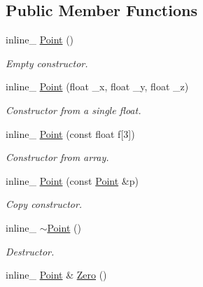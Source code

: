 \subsection*{Public Member Functions}
\begin{DoxyCompactItemize}
\item 
inline\+\_\+ \hyperlink{classOpcode_1_1Point_a0c5df0f77b3306c301db016c1735c23b}{Point} ()\hypertarget{classOpcode_1_1Point_a0c5df0f77b3306c301db016c1735c23b}{}\label{classOpcode_1_1Point_a0c5df0f77b3306c301db016c1735c23b}

\begin{DoxyCompactList}\small\item\em Empty constructor. \end{DoxyCompactList}\item 
inline\+\_\+ \hyperlink{classOpcode_1_1Point_ae3cafb7eb5ae4952b3eb7492f5479569}{Point} (float \+\_\+x, float \+\_\+y, float \+\_\+z)
\begin{DoxyCompactList}\small\item\em Constructor from a single float. \end{DoxyCompactList}\item 
inline\+\_\+ \hyperlink{classOpcode_1_1Point_ae0d5579671c2376488e3d4c5695ccdab}{Point} (const float f\mbox{[}3\mbox{]})\hypertarget{classOpcode_1_1Point_ae0d5579671c2376488e3d4c5695ccdab}{}\label{classOpcode_1_1Point_ae0d5579671c2376488e3d4c5695ccdab}

\begin{DoxyCompactList}\small\item\em Constructor from array. \end{DoxyCompactList}\item 
inline\+\_\+ \hyperlink{classOpcode_1_1Point_aa3bd16ca182640a7bfa2ebd785ea0ac2}{Point} (const \hyperlink{classOpcode_1_1Point}{Point} \&p)\hypertarget{classOpcode_1_1Point_aa3bd16ca182640a7bfa2ebd785ea0ac2}{}\label{classOpcode_1_1Point_aa3bd16ca182640a7bfa2ebd785ea0ac2}

\begin{DoxyCompactList}\small\item\em Copy constructor. \end{DoxyCompactList}\item 
inline\+\_\+ \hyperlink{classOpcode_1_1Point_a281124f3cd918e114d1fe0ee6ce1bba8}{$\sim$\+Point} ()\hypertarget{classOpcode_1_1Point_a281124f3cd918e114d1fe0ee6ce1bba8}{}\label{classOpcode_1_1Point_a281124f3cd918e114d1fe0ee6ce1bba8}

\begin{DoxyCompactList}\small\item\em Destructor. \end{DoxyCompactList}\item 
inline\+\_\+ \hyperlink{classOpcode_1_1Point}{Point} \& \hyperlink{classOpcode_1_1Point_aa625338765242a81df84b97f176e0d25}{Zero} ()\hypertarget{classOpcode_1_1Point_aa625338765242a81df84b97f176e0d25}{}\label{classOpcode_1_1Point_aa625338765242a81df84b97f176e0d25}


\end{DoxyCompactItemize}
